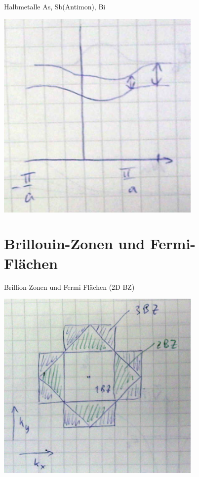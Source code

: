 Halbmetalle As, Sb(Antimon), Bi 

\includegraphics[width=0.75\textwidth]{kap06_46.png}




\section{Brillouin-Zonen und Fermi- Flächen}
Brillion-Zonen und Fermi Flächen (2D BZ)

\includegraphics[width=0.75\textwidth]{kap06_47.png}


